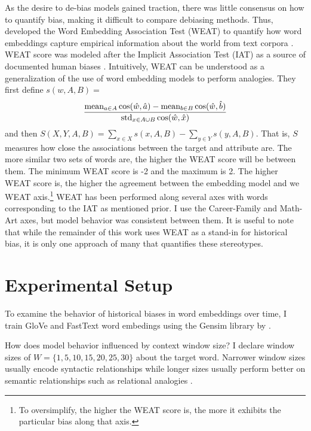 \documentclass[11pt,a4paper]{article}
\begin{document}
As the desire to de-bias models gained traction, there was little consensus on
how to quantify bias, making it difficult to compare debiasing methods. Thus,
\citet{weat-1608-07187} developed the Word Embedding Association Test (WEAT) to
quantify how word embeddings capture empirical information about the world from
text corpora \citep[8]{weat-1608-07187}. WEAT score was modeled after the
Implicit Association Test (IAT) as a source of documented human biases
\citep[2]{weat-1608-07187}. Intuitively, WEAT can be understood as a
generalization of the use of word embedding models to perform analogies. They
first define  $s(w, A,B)= $
$$\\ \frac{ \text{mean}_{a \in A} \cos(\hat{w}, \hat{a} ) - \text{mean}_{b \in
      B} \cos(\hat{w}, \hat{b} ) } {\text{std}_{x\in A \cup B} \cos(\hat{w},
      \hat{x})}$$  and then $S(X,Y,A,B) = \sum_{x\in X} s(x, A, B) -  \sum_{y\in
      Y} s(y, A, B)$. That is, $S$ measures how close the associations between
      the target and attribute are. The more similar two sets of words are, the
      higher the WEAT score will be between them. The minimum WEAT score is -2
      and the maximum is 2. The higher WEAT score is, the higher the agreement
      between the embedding model and we WEAT axis.\footnote{To oversimplify, the higher
      the WEAT score is, the more it exhibits the particular bias along that
      axis.} WEAT has been performed along several axes with words corresponding
      to the IAT as mentioned prior. I use the Career-Family and Math-Art axes,
      but model behavior was consistent between them. It is useful to note that
      while the remainder of this work uses WEAT as a stand-in for historical
      bias, it is only one approach of many that quantifies these stereotypes.


\section{Experimental Setup}

To examine the behavior of historical biases in word embeddings over time, I
train GloVe and FastText word embedings using the Gensim library by
\citet{rehurek_lrec}.

How does model behavior influenced by context window size?  I declare window
sizes of $W = \{1,5,10,15,20, 25, 30\}$ about the target word. Narrower window
sizes usually encode syntactic relationships while longer sizes usually perform
better on semantic relationships such as relational analogies
\citet{clark2013handbook}.
\end{document}
